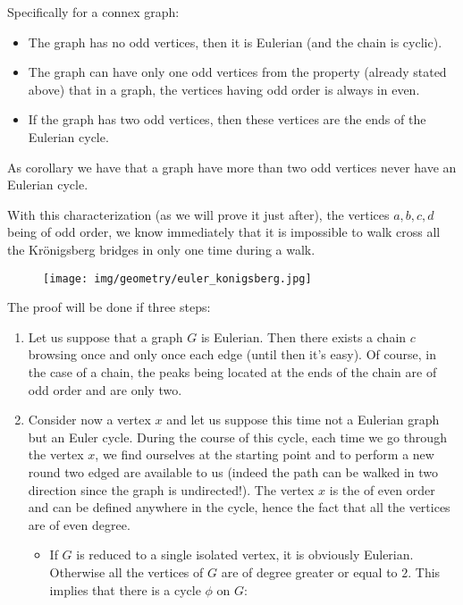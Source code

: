 {\begin{enumerate}
\begin{theorem}
	Specifically for a connex graph:
	\begin{itemize}
		\item The graph has no odd vertices, then it is Eulerian (and the chain is cyclic).
		
		\item The graph can have only one odd vertices from the property (already stated above) that in a graph, the vertices having odd order is always in even.
		
		\item If the graph has two odd vertices, then these vertices are the ends of the Eulerian cycle.
	\end{itemize}
	As corollary we have that a graph have more than two odd vertices never have an Eulerian cycle.
	\end{theorem}
	With this characterization (as we will prove it just after), the vertices $a,b,c,d$ being of odd order, we know immediately that it is impossible to walk cross all the Krönigsberg bridges in only one time during a walk.
	\begin{figure}[H]
		\centering
		\texttt{[image: img/geometry/euler\_konigsberg.jpg]}
	\end{figure}
	
	\pagebreak
	\begin{dem}
	The proof will be done if three steps:
	\begin{enumerate}
		\item Let us suppose that a graph $G$ is Eulerian. Then there exists a chain $c$ browsing once and only once each edge (until then it's easy). Of course, in the case of a chain, the peaks being located at the ends of the chain are of odd order and are only two.
		
		\item Consider now a vertex $x$ and let us suppose this time not a Eulerian graph but an Euler cycle. During the course of this cycle, each time we go through the vertex $x$, we find ourselves at the starting point and to perform a new round two edged are available to us (indeed the path can be walked in two direction since the graph is undirected!). The vertex $x$ is the of even order and can be defined anywhere in the cycle, hence the fact that all the vertices are of even degree.
		
		\begin{itemize}
			\item If $G$ is reduced to a single isolated vertex, it is obviously Eulerian. Otherwise all the vertices of $G$ are of degree greater or equal to $2$. This implies that there is a cycle $\phi$ on $G$:
			

\end{itemize}
\end{enumerate}
\end{dem}
\end{enumerate}}
